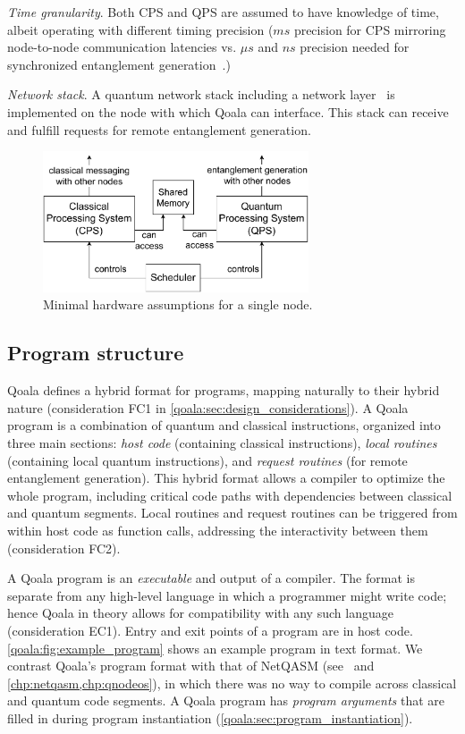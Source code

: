 \textit{Time granularity}. Both CPS and QPS are assumed to have knowledge of time, albeit operating with different timing precision ($ms$ precision for CPS mirroring node-to-node communication latencies vs. $\mu s$ and $ns$ precision needed for synchronized entanglement generation~\cite{pompili2022experimental, dahlberg2019link}.)

 \textit{Network stack}. A quantum network stack including a network layer~\cite{dahlberg2019link} is implemented on the node with which Qoala can interface. This stack can receive and fulfill requests for remote entanglement generation.
\begin{figure}
    \centering
    \includegraphics[width=0.7\textwidth]{figures/qoala/minimal-hardware.pdf}
    \caption{Minimal hardware assumptions for a single node.}
    \label{qoala:fig:minimal_hardware_assumptions}
\end{figure}



\subsection{Program structure}
\label{qoala:sec:program_structure}
Qoala defines a hybrid format for programs, mapping naturally to their hybrid nature (consideration FC1 in \cref{qoala:sec:design_considerations}).
A Qoala program is a combination of quantum and classical instructions, 
organized into three main sections: \textit{host code} (containing classical instructions), \textit{local routines} (containing local quantum instructions), 
and \textit{request routines} (for remote entanglement generation).
This hybrid format allows a compiler to optimize the whole program, including critical code paths with dependencies between classical and quantum segments.
Local routines and request routines can be triggered from within host code as function calls, addressing the interactivity between them (consideration FC2).

A Qoala program is an \textit{executable} and output of a compiler.
The format is separate from any high-level language in which a programmer might write code; hence Qoala in theory allows for compatibility with any such language (consideration EC1).
Entry and exit points of a program are in host code.
\cref{qoala:fig:example_program} shows an example program in text format.
We contrast Qoala's program format with that of NetQASM (see~\cite{dahlberg2022netqasm} and \cref{chp:netqasm,chp:qnodeos}), in which there was no way to compile across classical and quantum code segments.
A Qoala program has \textit{program arguments} that are filled in during program instantiation (\cref{qoala:sec:program_instantiation}).


